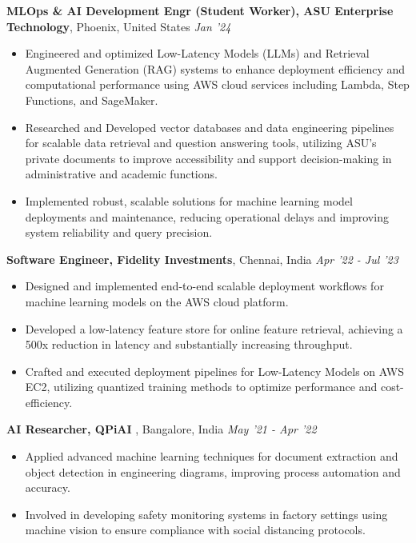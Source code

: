 \documentclass[10pt,a4]{article}
\begin{document}
{\begin{flushleft}
        \vspace{1.5mm}
        \textbf{\large MLOps \& AI Development Engr (Student Worker), ASU Enterprise Technology},  \large Phoenix, United States \hfill \textit{\large Jan '24}	\\
		\begin{itemize}
            \item Engineered and optimized Low-Latency Models (LLMs) and Retrieval Augmented Generation (RAG) systems to enhance deployment efficiency and computational performance using AWS cloud services including Lambda, Step Functions, and SageMaker.
            \item Researched and Developed vector databases and data engineering pipelines for scalable data retrieval and question answering tools, utilizing ASU’s private documents to improve accessibility and support decision-making in administrative and academic functions.
            \item Implemented robust, scalable solutions for machine learning model deployments and maintenance, reducing operational delays and improving system reliability and query precision.
        \end{itemize}	
        \vspace{0.5mm}
        \textbf{\large Software Engineer, Fidelity Investments},  \large Chennai, India \hfill \textit{\large Apr '22 - Jul '23}	\\
		\begin{itemize}
            \item Designed and implemented end-to-end scalable deployment workflows for machine learning models on the AWS cloud platform.  
            \item Developed a low-latency feature store for online feature retrieval, achieving a 500x reduction in latency and substantially increasing throughput.
            \item Crafted and executed deployment pipelines for Low-Latency Models on AWS EC2, utilizing quantized training methods to optimize performance and cost-efficiency. 
		\end{itemize}	
  
		\textbf{\large AI Researcher, QPiAI }, \large Bangalore, India \hfill \textit{\large May '21 - Apr '22}	\\
		\begin{itemize}
			  
			\item Applied advanced machine learning techniques for document extraction and object detection in engineering diagrams, improving process automation and accuracy.
			\item Involved in developing safety monitoring systems in factory settings using machine vision to ensure compliance with social distancing protocols.
        \end{itemize}		


\end{flushleft}}
\end{document}
